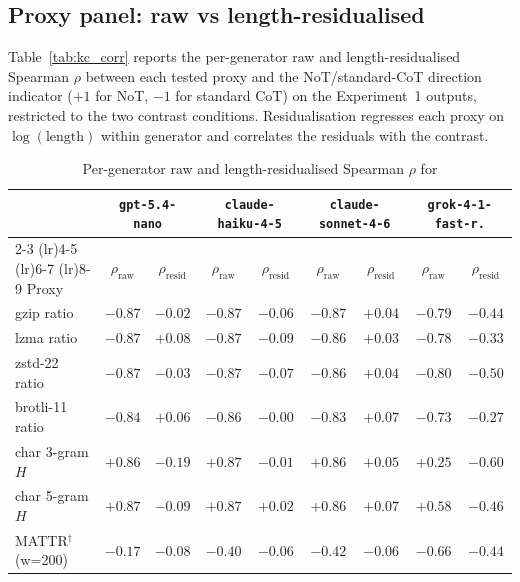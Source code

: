 \documentclass[11pt]{article}
\begin{document}
\subsection{Proxy panel: raw vs length-residualised}
\label{app:kc_panel}

Table~\ref{tab:kc_corr} reports the per-generator raw and
length-residualised Spearman $\rho$ between each tested proxy and the
NoT/standard-CoT direction indicator ($+1$ for NoT, $-1$ for
standard CoT) on the Experiment~1 outputs, restricted to the two contrast
conditions. Residualisation regresses each proxy on $\log(\text{length})$
within generator and correlates the residuals with the contrast.

\begin{table}[!tbp]
\centering
\small
\setlength{\tabcolsep}{6pt}
\begin{tabular}{lcccccccc}
\toprule
& \multicolumn{2}{c}{\texttt{gpt-5.4-nano}}
& \multicolumn{2}{c}{\texttt{claude-haiku-4-5}}
& \multicolumn{2}{c}{\texttt{claude-sonnet-4-6}}
& \multicolumn{2}{c}{\texttt{grok-4-1-fast-r.}} \\
\cmidrule(lr){2-3} \cmidrule(lr){4-5} \cmidrule(lr){6-7} \cmidrule(lr){8-9}
Proxy & $\rho_{\text{raw}}$ & $\rho_{\text{resid}}$
      & $\rho_{\text{raw}}$ & $\rho_{\text{resid}}$
      & $\rho_{\text{raw}}$ & $\rho_{\text{resid}}$
      & $\rho_{\text{raw}}$ & $\rho_{\text{resid}}$ \\
\midrule
gzip ratio                & $-0.87$ & $-0.02$ & $-0.87$ & $-0.06$ & $-0.87$ & $+0.04$ & $-0.79$ & $-0.44$ \\
lzma ratio                & $-0.87$ & $+0.08$ & $-0.87$ & $-0.09$ & $-0.86$ & $+0.03$ & $-0.78$ & $-0.33$ \\
zstd-22 ratio             & $-0.87$ & $-0.03$ & $-0.87$ & $-0.07$ & $-0.86$ & $+0.04$ & $-0.80$ & $-0.50$ \\
brotli-11 ratio           & $-0.84$ & $+0.06$ & $-0.86$ & $-0.00$ & $-0.83$ & $+0.07$ & $-0.73$ & $-0.27$ \\
char 3-gram $H$           & $+0.86$ & $-0.19$ & $+0.87$ & $-0.01$ & $+0.86$ & $+0.05$ & $+0.25$ & $-0.60$ \\
char 5-gram $H$           & $+0.87$ & $-0.09$ & $+0.87$ & $+0.02$ & $+0.86$ & $+0.07$ & $+0.58$ & $-0.46$ \\
MATTR$^{\dagger}$ (w=200) & $-0.17$ & $-0.08$ & $-0.40$ & $-0.06$ & $-0.42$ & $-0.06$ & $-0.66$ & $-0.44$ \\
\bottomrule
\end{tabular}
\caption{Per-generator raw and length-residualised Spearman $\rho$ for
}
\end{table}
\end{document}
